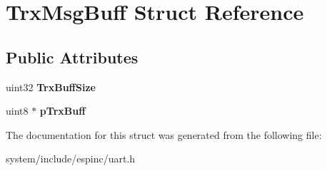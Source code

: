 \hypertarget{struct_trx_msg_buff}{}\section{Trx\+Msg\+Buff Struct Reference}
\label{struct_trx_msg_buff}
\subsection*{Public Attributes}
\begin{DoxyCompactItemize}
\item 
\hypertarget{struct_trx_msg_buff_aee542f95d3ce814656ea3bdc22460c59}{}uint32 {\bfseries Trx\+Buff\+Size}\label{struct_trx_msg_buff_aee542f95d3ce814656ea3bdc22460c59}

\item 
\hypertarget{struct_trx_msg_buff_ad16cb1fb229feafea7ce6a7142fcc4f8}{}uint8 $\ast$ {\bfseries p\+Trx\+Buff}\label{struct_trx_msg_buff_ad16cb1fb229feafea7ce6a7142fcc4f8}

\end{DoxyCompactItemize}


The documentation for this struct was generated from the following file\+:\begin{DoxyCompactItemize}
\item 
system/include/espinc/uart.\+h\end{DoxyCompactItemize}
